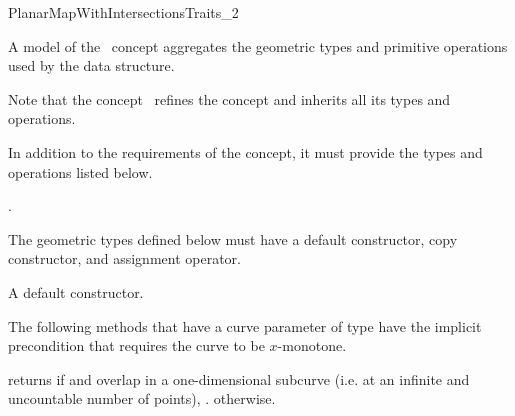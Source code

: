 
\ccRefPageBegin

\begin{ccRefConcept}{PlanarMapWithIntersectionsTraits_2}

\ccDefinition
A model of the \ccRefName\ concept aggregates the geometric types and
primitive operations used by the 
 data structure.

Note that the concept \ccRefName\ refines the concept 
and inherits all its types and operations.

In addition to the requirements of the  concept, it must
provide the types and operations listed below.

\ccRefines
{} .

\ccTypes

The geometric types defined below must have a default constructor,
copy constructor, and assignment operator.



\ccCreation
    
{A default constructor.}

\ccOperations

The following methods that have a curve parameter of type
 have the implicit precondition that requires the
curve to be $x$-monotone.

         {returns  if  and  overlap
          in a one-dimensional subcurve (i.e. at an infinite and uncountable 
          number of points), . otherwise.}


\end{ccRefConcept}

